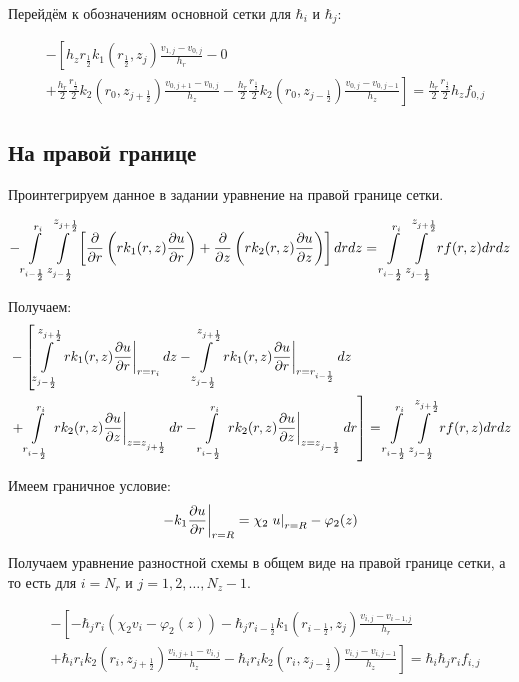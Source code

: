 Перейдём к обозначениям основной сетки для $ \hbar_i $ и $ \hbar_j $:

\begin{align*}
  &- \left [ 
    h_z r_{\frac{1}{2}} k_1(r_{\frac{1}{2}}, z_j) \frac{v_{1, j} - v_{0, j}}{h_{r}}
    - 0
    \right . \\
    &\left .
    + \frac{h_r}{2} \frac{r_{\frac{1}{2}}}{2} k_2(r_0, z_{j+\frac{1}{2}}) \frac{v_{0, j + 1} - v_{0, j}}{h_{z}}
    - \frac{h_r}{2} \frac{r_{\frac{1}{2}}}{2} k_2(r_0, z_{j-\frac{1}{2}}) \frac{v_{0, j} - v_{0, j - 1}}{h_z}
    \right ]  = \frac{h_r}{2} \frac{r_{\frac{1}{2}}}{2} h_z f_{0, j}
\end{align*}

\subsection{На правой границе}
Проинтегрируем данное в задании уравнение на правой границе сетки.

\[
  - \mLim{}{-\frac{1}{2}}{+\frac{1}{2}}{-\frac{1}{2}} \left [ \pdv{}{r} \left ( r k_1(r, z) \pdv{u}{r} \right ) 
  + \pdv{}{z} \left ( rk_2(r, z)\pdv{u}{z} \right ) \right ]dr dz = \mLim{}{-\frac{1}{2}}{+\frac{1}{2}}{-\frac{1}{2}} rf(r, z)dr dz
\]

Получаем:
\begin{align*}
  &- \left [
   \mLimZ{z}{+\frac{1}{2}}{-\frac{1}{2}}{j}  \left . r k_1(r, z) \pdv{u}{r} \right \vert_{r = r_{i}} dz
  - \mLimZ{z}{+\frac{1}{2}}{-\frac{1}{2}}{j} \left . r k_1(r, z) \pdv{u}{r} \right \vert_{r = r_{i - \frac{1}{2}}} dz
  \right . \\
  &\left . + \mLimS{r}{}{-\frac{1}{2}} \left . rk_2(r, z)\pdv{u}{z} \right \vert_{z = z_{j + \frac{1}{2}}} dr
  - \mLimS{r}{}{-\frac{1}{2}} \left . rk_2(r, z)\pdv{u}{z} \right \vert_{z = z_{j - \frac{1}{2}}} dr
  \right ] = \mLim{}{-\frac{1}{2}}{+\frac{1}{2}}{-\frac{1}{2}} rf(r, z) dr dz
\end{align*}

Имеем граничное условие:
\[
  \left . -k_1 \pdv{u}{r} \right \vert_{r=R} = \chi_2 \left . u \right \vert_{r=R} - \varphi_2(z)
\]

Получаем уравнение разностной схемы в общем виде на правой границе сетки, а то есть
для $ i = N_r $ и $ j = 1,2, \dots, N_z-1 $.

\begin{align*}
  &- \left [ 
  -\hbar_j r_i ( \chi_2 v_i - \varphi_2(z))
  - \hbar_j r_{i-\frac{1}{2}} k_1(r_{i-\frac{1}{2}}, z_j) \frac{v_{i, j} - v_{i - 1, j}}{h_{r}}
  \right . \\
  &\left .
  + \hbar_i r_{i} k_2(r_i, z_{j+\frac{1}{2}}) \frac{v_{i, j + 1} - v_{i, j}}{h_{z}}
  - \hbar_i r_{i} k_2(r_i, z_{j-\frac{1}{2}}) \frac{v_{i, j} - v_{i, j - 1}}{h_z}
  \right ]  = \hbar_i \hbar_j r_i f_{i, j}
\end{align*}

